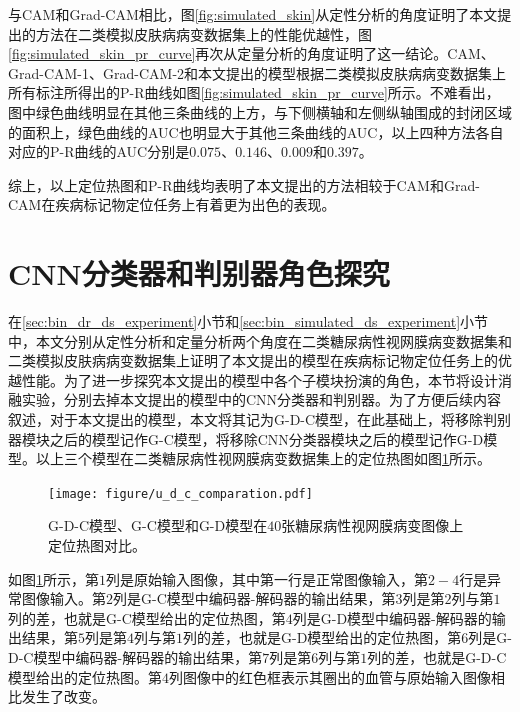 与CAM和Grad-CAM相比，图\ref{fig:simulated_skin}从定性分析的角度证明了本文提出的方法在二类模拟皮肤病病变数据集上的性能优越性，图\ref{fig:simulated_skin_pr_curve}再次从定量分析的角度证明了这一结论。CAM、Grad-CAM-1、Grad-CAM-2和本文提出的模型根据二类模拟皮肤病病变数据集上所有标注所得出的P-R曲线如图\ref{fig:simulated_skin_pr_curve}所示。不难看出，图中绿色曲线明显在其他三条曲线的上方，与下侧横轴和左侧纵轴围成的封闭区域的面积上，绿色曲线的AUC也明显大于其他三条曲线的AUC，以上四种方法各自对应的P-R曲线的AUC分别是$0.075$、$0.146$、$0.009$和$0.397$。

综上，以上定位热图和P-R曲线均表明了本文提出的方法相较于CAM和Grad-CAM在疾病标记物定位任务上有着更为出色的表现。
\section{CNN分类器和判别器角色探究}\label{sec:g_c_g_d_g_d_c_comparsion}
在\ref{sec:bin_dr_ds_experiment}小节和\ref{sec:bin_simulated_ds_experiment}小节中，本文分别从定性分析和定量分析两个角度在二类糖尿病性视网膜病变数据集和二类模拟皮肤病病变数据集上证明了本文提出的模型在疾病标记物定位任务上的优越性能。为了进一步探究本文提出的模型中各个子模块扮演的角色，本节将设计消融实验，分别去掉本文提出的模型中的CNN分类器和判别器。为了方便后续内容叙述，对于本文提出的模型，本文将其记为G-D-C模型，在此基础上，将移除判别器模块之后的模型记作G-C模型，将移除CNN分类器模块之后的模型记作G-D模型。以上三个模型在二类糖尿病性视网膜病变数据集上的定位热图如图\ref{fig:u_d_c_comparation}所示。
\begin{figure}[h]
	\centering
	\texttt{[image: figure/u\_d\_c\_comparation.pdf]}
	\caption[G-D-C模型、G-C模型和G-D模型定位热图对比]{G-D-C模型、G-C模型和G-D模型在$40$张糖尿病性视网膜病变图像上定位热图对比。} 
	\label{fig:u_d_c_comparation}
\end{figure}

如图\ref{fig:u_d_c_comparation}所示，第$1$列是原始输入图像，其中第一行是正常图像输入，第$2-4$行是异常图像输入。第$2$列是G-C模型中编码器-解码器的输出结果，第$3$列是第$2$列与第$1$列的差，也就是G-C模型给出的定位热图，第$4$列是G-D模型中编码器-解码器的输出结果，第$5$列是第$4$列与第$1$列的差，也就是G-D模型给出的定位热图，第$6$列是G-D-C模型中编码器-解码器的输出结果，第$7$列是第$6$列与第$1$列的差，也就是G-D-C模型给出的定位热图。第$4$列图像中的红色框表示其圈出的血管与原始输入图像相比发生了改变。

